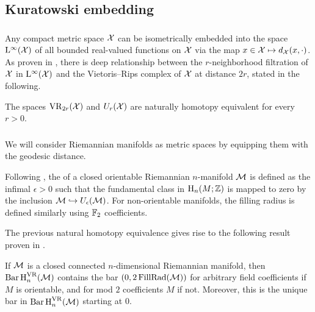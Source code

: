 

\subsection{Kuratowski embedding}\label{sub:filling radii}

\subsubsection{}\label{ss:kuratowski}

Any compact metric space $\mathcal{X}$ can be isometrically embedded into the space $\mathrm{L}^\infty(\mathcal{X})$ of all bounded real-valued functions on $\mathcal{X}$ via the map $x \in \mathcal{X} \mapsto d_{\mathcal{X}}(x,\cdot)$.
As proven in \cite[Theorem.4.1]{lim2020vietoris}, there is deep relationship between the \(r\)-neighborhood filtration of $\mathcal{X}$ in $\mathrm{L}^\infty(\mathcal{X})$ and the Vietoris--Rips complex of \(\mathcal{X}\) at distance \(2r\), stated in the following.

\medskip\lemma The spaces $\mathrm{VR}_{2r}(\mathcal{X})$ and $U_r(\mathcal{X})$ are naturally homotopy equivalent for every \(r > 0\).

\subsubsection{}\label{ss:filling_radius}

We will consider Riemannian manifolds as metric spaces by equipping them with the geodesic distance.

Following \cite{gromov1983filling}, the  of a closed orientable Riemannian $n$-manifold $\mathcal{M}$ is defined as the infimal $\epsilon > 0$ such that the fundamental class in $\mathrm{H}_n(M; \mathbb{Z})$ is mapped to zero by the inclusion $\mathcal{M} \hookrightarrow U_\epsilon(\mathcal{M})$.
For non-orientable manifolds, the filling radius is defined similarly using \({\mathbb{F}_2}\) coefficients.

The previous natural homotopy equivalence gives rise to the following result proven in \cite[Prop.9.28]{lim2020vietoris}.

\medskip\lemma
If $\mathcal{M}$ is a closed connected $n$-dimensional Riemannian manifold, then \(\operatorname{Bar} \operatorname{H}_{n}^{\mathrm{VR}} (\mathcal{M})\) contains the bar \((0,2\operatorname{FillRad}(\mathcal{M}))\) for arbitrary field coefficients if $M$ is orientable, and for mod $2$ coefficients $M$ if not.
Moreover, this is the unique bar in \(\operatorname{Bar} \operatorname{H}_{n}^{\mathrm{VR}} (\mathcal{M})\) starting at $0$.

